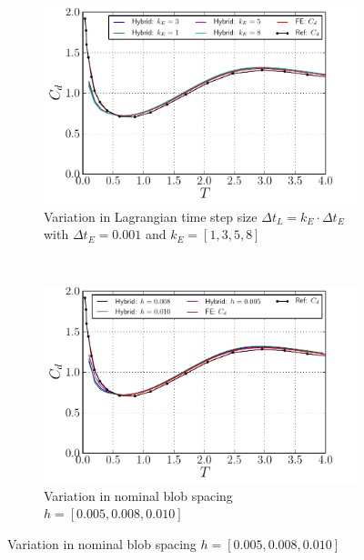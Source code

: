 	\begin{figure}[!p]
     \centering
     \begin{subfigure}[t]{0.49\textwidth}
             \includegraphics[width=\textwidth]{./figures/validation/isc/hybrid_ISC_drag_kE.pdf}
             \caption{Variation in Lagrangian time step size $\Delta t_L = k_E\cdot \Delta t_E$ with $\Delta t_E = 0.001$ and $k_E = [1,3,5,8]$}
             \label{fig:hybrid_ISC_drag_kComparison}
     \end{subfigure}%
     ~ %
     \begin{subfigure}[t]{0.49\textwidth}
             \includegraphics[width=\textwidth]{./figures/validation/isc/hybrid_ISC_drag_nBlob.pdf}
             \caption{Variation in nominal blob spacing $h = [0.005, 0.008, 0.010]$}
             \label{fig:hybrid_ISC_drag_nBlobComparison}
     \end{subfigure}
     

\end{figure}
